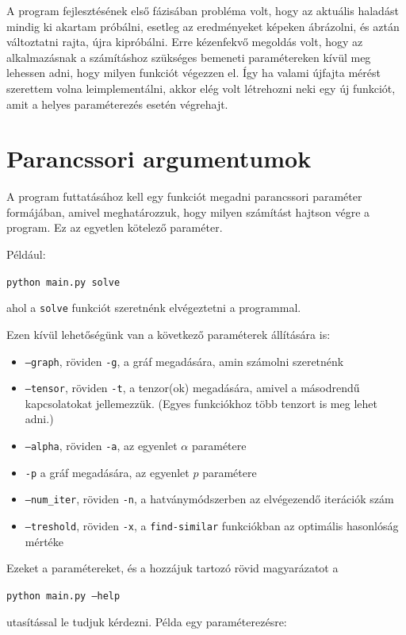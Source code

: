\documentclass[12pt,numbers=noenddot]{report}
\begin{document}
A program fejlesztésének első fázisában probléma volt, hogy az aktuális haladást
mindig ki akartam próbálni, esetleg az eredményeket képeken ábrázolni, és aztán
változtatni rajta, újra kipróbálni. Erre kézenfekvő megoldás volt, hogy 
az alkalmazásnak a számításhoz szükséges bemeneti paramétereken kívül 
meg lehessen adni, hogy milyen funkciót végezzen el.
Így ha valami újfajta mérést szerettem volna leimplementálni, akkor elég volt
létrehozni neki egy új funkciót, amit a helyes paraméterezés esetén végrehajt.

\section{Parancssori argumentumok}

A program futtatásához kell egy funkciót megadni parancssori paraméter formájában, 
amivel meghatározzuk, hogy milyen számítást hajtson végre a program. 
Ez az egyetlen kötelező paraméter.

\noindent
Például:

\texttt{python main.py solve}

\noindent
ahol a \texttt{solve} funkciót szeretnénk elvégeztetni a programmal.

Ezen kívül lehetőségünk van a következő paraméterek állítására is:

\begin{itemize}
	\item \texttt{--graph}, röviden \texttt{-g}, a gráf megadására, 
		amin számolni szeretnénk
	\item \texttt{--tensor}, röviden \texttt{-t}, a tenzor(ok) megadására, 
		amivel a másodrendű kapcsolatokat jellemezzük. 
		(Egyes funkciókhoz több tenzort is meg lehet adni.)
	\item \texttt{--alpha}, röviden \texttt{-a}, az egyenlet $\alpha$ paramétere
	\item \texttt{-p} a gráf megadására, az egyenlet $p$ paramétere
	\item \texttt{--num\_iter}, röviden \texttt{-n}, a hatványmódszerben az 
		elvégezendő iterációk szám
	\item \texttt{--treshold}, röviden \texttt{-x}, a \texttt{find-similar} 
		funkciókban az optimális hasonlóság mértéke
\end{itemize}

\noindent
Ezeket a paramétereket, és a hozzájuk tartozó rövid magyarázatot a

\texttt{python main.py --help}

\noindent
utasítással le tudjuk kérdezni.
Példa egy paraméterezésre:
\end{document}
